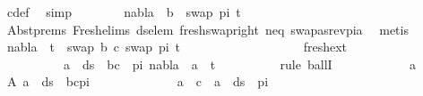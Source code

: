 \begin{isabellebody}
\ c{\isacharunderscore}{\kern0pt}def\ \isamarkupfalse%
\ simp\isanewline
\ \ \ \ \ \ \isamarkupfalse%
\ {\isachardoublequoteopen}nabla\ {\isasymturnstile}\ b\ {\isasymsharp}\ swap\ pi\ t{\isacharprime}{\kern0pt}{\isachardoublequoteclose}\ \isanewline
\ \ \ \ \ \ \ \ \isamarkupfalse%
\ Abst{\isachardot}{\kern0pt}prems\ Fresh{\isacharunderscore}{\kern0pt}elims{\isacharparenleft}{\kern0pt}{}{\isacharparenright}{\kern0pt}\ ds{\isacharunderscore}{\kern0pt}elem\ fresh{\isacharunderscore}{\kern0pt}swap{\isacharunderscore}{\kern0pt}right\ neq\ swapas{\isacharunderscore}{\kern0pt}rev{\isacharunderscore}{\kern0pt}pi{\isacharunderscore}{\kern0pt}a\ \isamarkupfalse%
\ metis\isanewline
\ \ \ \ \ \ \isamarkupfalse%
\ {\isachardoublequoteopen}nabla\ {\isasymturnstile}\ t{\isacharprime}{\kern0pt}\ {\isasymapprox}\ swap\ {\isacharbrackleft}{\kern0pt}{\isacharparenleft}{\kern0pt}b{\isacharcomma}{\kern0pt}\ c{\isacharparenright}{\kern0pt}{\isacharbrackright}{\kern0pt}\ {\isacharparenleft}{\kern0pt}swap\ pi\ t{\isacharprime}{\kern0pt}{\isacharparenright}{\kern0pt}{\isachardoublequoteclose}\isanewline
\ \ \ \ \ \ \isamarkupfalse%
\ {\isacharminus}{\kern0pt}\isanewline
\ \ \ \ \ \ \ \ \ \isamarkupfalse%
\ fresh{\isacharunderscore}{\kern0pt}ext{\isacharcolon}{\kern0pt}\isanewline
\ \ \ \ \ \ \ \ \ \ {\isachardoublequoteopen}{\isasymforall}a\ {\isasymin}\ ds\ {\isacharbrackleft}{\kern0pt}{\isacharbrackright}{\kern0pt}\ {\isacharparenleft}{\kern0pt}{\isacharparenleft}{\kern0pt}b{\isacharcomma}{\kern0pt}c{\isacharparenright}{\kern0pt}\ {\isacharhash}{\kern0pt}\ pi{\isacharparenright}{\kern0pt}{\isachardot}{\kern0pt}\ nabla\ {\isasymturnstile}\ a\ {\isasymsharp}\ t{\isacharprime}{\kern0pt}{\isachardoublequoteclose}\isanewline
\ \ \ \ \ \ \ \ \isamarkupfalse%
\ {\isacharparenleft}{\kern0pt}rule\ ballI{\isacharparenright}{\kern0pt}\isanewline
\ \ \ \ \ \ \ \ \ \ \isamarkupfalse%
\ a\ \isamarkupfalse%
\ A{\isacharcolon}{\kern0pt}\ {\isachardoublequoteopen}a\ {\isasymin}\ ds\ {\isacharbrackleft}{\kern0pt}{\isacharbrackright}{\kern0pt}\ {\isacharparenleft}{\kern0pt}{\isacharparenleft}{\kern0pt}b{\isacharcomma}{\kern0pt}c{\isacharparenright}{\kern0pt}{\isacharhash}{\kern0pt}pi{\isacharparenright}{\kern0pt}{\isachardoublequoteclose}\isanewline
\ \ \ \ \ \ \ \ \ \ \isamarkupfalse%
\ \isamarkupfalse%
\ {\isachardoublequoteopen}a\ {\isacharequal}{\kern0pt}\ c\ {\isasymor}\ a\ {\isasymin}\ ds\ {\isacharbrackleft}{\kern0pt}{\isacharbrackright}{\kern0pt}\ pi{\isachardoublequoteclose}\isanewline

\end{isabellebody}
